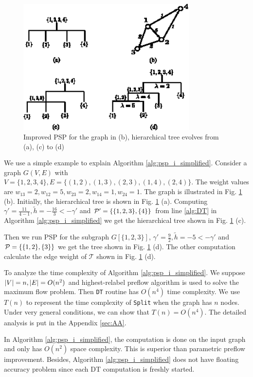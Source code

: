 \documentclass[runningheads]{llncs}
\begin{document}
\begin{figure}[!ht]
	\centering
	\includegraphics[width=9cm]{pic/alg_illustration.eps}
	\caption{Improved PSP for the graph in (b), hierarchical tree evolves from (a), (c) to (d) }\label{fig:alg_eg}
\end{figure}

\begin{example}
	We use a simple example to explain Algorithm \ref{alg:psp_i_simplified}. Consider a graph $G(V, E)$ with $V=\{1,2,3,4\}, E=\{(1,2),(1,3),(2,3),(1,4),(2,4)\}$. The weight values are $w_{13}=2, w_{12}=5, w_{23}=2, w_{14}=1, w_{24}=1$. The graph is illustrated
	in Fig. \ref{fig:alg_eg} (b). Initially, the hierarchical tree is shown in Fig. \ref{fig:alg_eg} (a). Computing $\gamma' = \frac{11}{4-1}, \tilde{h} = -\frac{16}{3} < -\gamma' $ and $\P' = \{\{1,2,3\},\{4\}\}$ from line \ref {alg:DT} in Algorithm \ref{alg:psp_i_simplified} we get the hierarchical tree shown in Fig. \ref{fig:alg_eg} (c).
	
	Then we run PSP for the subgraph $G[\{1,2,3\}]$, $\gamma' = \frac{9}{2}, \tilde{h} = -5 < -\gamma'$ and $\P= \{\{1,2\},\{3\}\}$ we get the tree shown in Fig. \ref{fig:alg_eg} (d). The other computation calculate the edge weight of $\mathcal{T}$ shown in Fig. \ref{fig:alg_eg} (d).
\end{example}		

To analyze the time complexity of Algorithm \ref{alg:psp_i_simplified}. We suppose $\abs{V} = n, \abs{E} = O(n^2)$ and highest-relabel preflow algorithm is used to solve the maximum flow problem. Then \texttt{DT} routine has $O(n^4)$ time complexity. 
We use $T(n)$ to represent the time complexity of \texttt{Split} when the graph has $n$ nodes. Under very general conditions, we can show that $T(n) = O(n^4)$. The detailed analysis is put in the Appendix \ref{sec:AA}.

In Algorithm \ref{alg:psp_i_simplified}, the computation is done on the input graph and only has $O(n^2)$ space complexity. This is superior than parametric preflow improvement. Besides, Algorithm \ref{alg:psp_i_simplified} does not have floating accuracy problem since each DT computation is freshly started. 
\end{document}
